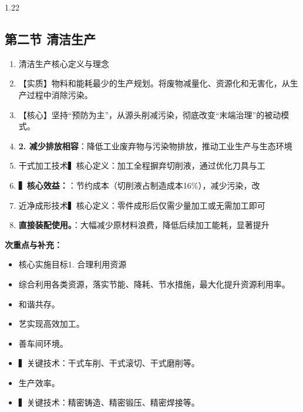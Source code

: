 \documentclass[12pt,a4paper]{article}
\begin{document}
\begin{spacing}{1.22}
\subsection{第二节 清洁生产}
\begin{tcolorbox}[colback=yellow!6,colframe=red!55!black,title=重点,left=1mm,right=1mm]
\begin{enumerate}[leftmargin=2.2em,label=\arabic*.]
  \item 清洁生产核心定义与理念
  \item 【实质】物料和能耗最少的生产规划。将废物减量化、资源化和无害化，从生产过程中消除污染。
  \item 【核心】坚持“预防为主”，从源头削减污染，彻底改变“末端治理”的被动模式。
  \item \textbf{2. 减少排放相容}：降低工业废弃物与污染物排放，推动工业生产与生态环境
  \item 干式加工技术▍核心定义：加工全程摒弃切削液，通过优化刀具与工
  \item \textbf{▍核心效益：}：节约成本（切削液占制造成本16\%），减少污染，改
  \item 近净成形技术▍核心定义：零件成形后仅需少量加工或无需加工即可
  \item \textbf{直接装配使用。}：大幅减少原材料浪费，降低后续加工能耗，显著提升
\end{enumerate}
\end{tcolorbox}
\noindent\textbf{次重点与补充：}
\begin{itemize}[leftmargin=2.2em,label=--]
  \item 核心实施目标1. 合理利用资源
  \item 综合利用各类资源，落实节能、降耗、节水措施，最大化提升资源利用率。
  \item 和谐共存。
  \item 艺实现高效加工。
  \item 善车间环境。
  \item ▍关键技术：干式车削、干式滚切、干式磨削等。
  \item 生产效率。
  \item ▍关键技术：精密铸造、精密锻压、精密焊接等。
\end{itemize}


\end{spacing}
\end{document}
